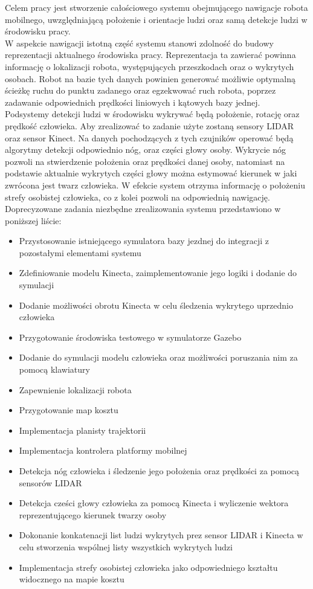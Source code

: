 Celem pracy jest stworzenie całościowego systemu obejmującego nawigacje robota mobilnego, uwzględniającą położenie i orientacje ludzi oraz samą detekcje ludzi w środowisku pracy.\\
\indent W aspekcie nawigacji istotną część systemu stanowi zdolność do budowy reprezentacji aktualnego środowiska pracy. Reprezentacja ta zawierać powinna informację o lokalizacji robota, występujących przeszkodach oraz o wykrytych osobach. Robot na bazie tych danych powinien generować możliwie optymalną ścieżkę ruchu do punktu zadanego oraz egzekwować ruch robota, poprzez zadawanie odpowiednich prędkości liniowych i kątowych bazy jednej. \\
\indent Podsystemy detekcji ludzi w środowisku wykrywać będą położenie, rotację oraz prędkość człowieka. Aby zrealizować to zadanie użyte zostaną sensory LIDAR oraz sensor Kinect. Na danych pochodzących z tych czujników operować będą algorytmy detekcji odpowiednio nóg, oraz części głowy osoby. Wykrycie nóg pozwoli na stwierdzenie położenia oraz prędkości danej osoby, natomiast na podstawie aktualnie wykrytych części głowy można estymować kierunek w jaki zwrócona jest twarz człowieka. W efekcie system otrzyma informację o położeniu strefy osobistej człowieka, co z kolei pozwoli na odpowiednią nawigację. \\

Doprecyzowane zadania niezbędne zrealizowania systemu przedstawiono w poniższej liście:

\begin{itemize}
\item Przystosowanie istniejącego symulatora bazy jezdnej do integracji z pozostałymi elementami systemu
\item Zdefiniowanie modelu Kinecta, zaimplementowanie jego logiki i dodanie do symulacji
\item Dodanie możliwości obrotu Kinecta w celu śledzenia wykrytego uprzednio człowieka
\item Przygotowanie środowiska testowego w symulatorze Gazebo
\item Dodanie do symulacji modelu człowieka oraz możliwości poruszania nim za pomocą klawiatury
\item Zapewnienie lokalizacji robota
\item Przygotowanie map kosztu
\item Implementacja planisty trajektorii
\item Implementacja kontrolera platformy mobilnej
\item Detekcja nóg człowieka i śledzenie jego położenia oraz prędkości za pomocą sensorów LIDAR
\item Detekcja cześci głowy człowieka za pomocą Kinecta i wyliczenie wektora reprezentującego kierunek twarzy osoby
\item Dokonanie konkatenacji list ludzi wykrytych prez sensor LIDAR i Kinecta w celu stworzenia wspólnej listy wszystkich wykrytych ludzi
\item Implementacja strefy osobistej człowieka jako odpowiedniego kształtu widocznego na mapie kosztu 
\end{itemize}


